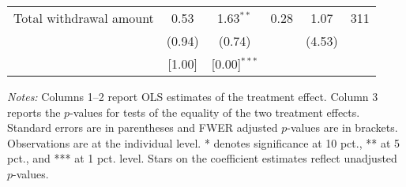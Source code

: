 \begin{table}[h]
{\begin{threeparttable}
\begin{tabular}{l*{5}{c}}
Total withdrawal amount&     0.53&1.63$^{**}$&     0.28&     1.07&      311\\
          &   (0.94)&   (0.74)&         &   (4.53)&         \\
          &   [1.00]&[0.00]$^{***}$&         &         &         \\
\bottomrule \end{tabular} \begin{tablenotes}[flushleft] \footnotesize \item \emph{Notes:} Columns 1--2 report OLS estimates of the treatment effect. Column 3 reports the \(p\)-values for tests of the equality of the two treatment effects. Standard errors are in parentheses and FWER adjusted \(p\)-values are in brackets. Observations are at the individual level. * denotes significance at 10 pct., ** at 5 pct., and *** at 1 pct. level. Stars on the coefficient estimates reflect unadjusted \(p\)-values. \end{tablenotes} \end{threeparttable} } \end{table}

